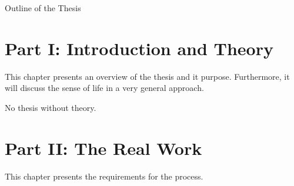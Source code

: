\clearemptydoublepage

{}

\begin{center}
	\huge{Outline of the Thesis}
\end{center}




\section*{Part I: Introduction and Theory}

  \vspace{1mm}

\noindent  This chapter presents an overview of the thesis and it purpose. Furthermore, it will discuss the sense of life in a very general approach.  \\

  \vspace{1mm}

\noindent  No thesis without theory.   \\

\section*{Part II: The Real Work}

  \vspace{1mm}

\noindent  This chapter presents the requirements for the process.